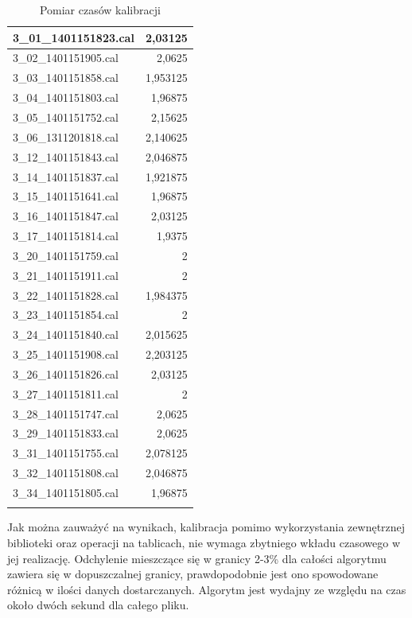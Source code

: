 \begin{longtable}{|l|r|}
    3\_01\_1401151823.cal & 2,03125 \\ \hline
    3\_02\_1401151905.cal & 2,0625 \\ \hline
    3\_03\_1401151858.cal & 1,953125 \\ \hline
    3\_04\_1401151803.cal & 1,96875 \\ \hline
    3\_05\_1401151752.cal & 2,15625 \\ \hline
    3\_06\_1311201818.cal & 2,140625 \\ \hline
    3\_12\_1401151843.cal & 2,046875 \\ \hline
    3\_14\_1401151837.cal & 1,921875 \\ \hline
    3\_15\_1401151641.cal & 1,96875 \\ \hline
    3\_16\_1401151847.cal & 2,03125 \\ \hline
    3\_17\_1401151814.cal & 1,9375 \\ \hline
    3\_20\_1401151759.cal & 2 \\ \hline
    3\_21\_1401151911.cal & 2 \\ \hline
    3\_22\_1401151828.cal & 1,984375 \\ \hline
    3\_23\_1401151854.cal & 2 \\ \hline
    3\_24\_1401151840.cal & 2,015625 \\ \hline
    3\_25\_1401151908.cal & 2,203125 \\ \hline
    3\_26\_1401151826.cal & 2,03125 \\ \hline
    3\_27\_1401151811.cal & 2 \\ \hline
    3\_28\_1401151747.cal & 2,0625 \\ \hline
    3\_29\_1401151833.cal & 2,0625 \\ \hline
    3\_31\_1401151755.cal & 2,078125 \\ \hline
    3\_32\_1401151808.cal & 2,046875 \\ \hline
    3\_34\_1401151805.cal & 1,96875 \\ \hline
    \caption{Pomiar czasów kalibracji}
    \label{tab:calibration}\\
    \end{longtable}
Jak można zauważyć na wynikach, kalibracja pomimo wykorzystania zewnętrznej biblioteki oraz operacji na tablicach, nie wymaga zbytniego wkładu czasowego w jej realizację. Odchylenie mieszczące się w granicy 2-3\% dla całości algorytmu zawiera się w dopuszczalnej granicy, prawdopodobnie jest ono spowodowane różnicą w ilości danych dostarczanych. Algorytm jest wydajny ze względu na czas około dwóch sekund dla całego pliku.
